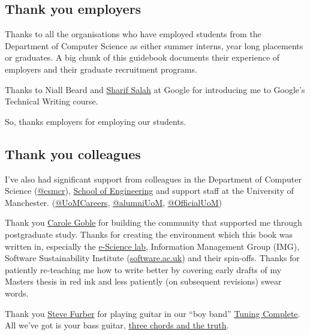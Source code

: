 \documentclass[
]{book}
\begin{document}
\hypertarget{employers}{%
\subsection{Thank you employers}\label{employers}}

Thanks to all the organisations who have employed students from the Department of Computer Science as either summer interns, year long placements or graduates. A big chunk of this guidebook documents their experience of employers and their graduate recruitment programs.

Thanks to Niall Beard and \href{https://github.com/sharifsalah}{Sharif Salah} at Google for introducing me to Google's Technical Writing course. \citep{googling}

So, thanks employers for employing our students. 🙏

\hypertarget{colleagues}{%
\subsection{Thank you colleagues}\label{colleagues}}

I've also had significant support from colleagues in the Department of Computer Science (\href{https://twitter.com/csmcr}{@csmcr}), \href{https://www.se.manchester.ac.uk/about/schools/engineering/}{School of Engineering} and support staff at the University of Manchester. (\href{https://twitter.com/UoMCareers}{@UoMCareers}, \href{https://twitter.com/alumniUoM}{@alumniUoM}, \href{https://twitter.com/OfficialUoM}{@OfficialUoM})

Thank you \href{https://en.wikipedia.org/wiki/Carole_Goble}{Carole Goble} for building the community that supported me through postgraduate study. Thanks for creating the environment which this book was written in, especially the \href{https://esciencelab.org.uk/}{e-Science lab}, Information Management Group (IMG), Software Sustainability Institute (\href{https://software.ac.uk/}{software.ac.uk}) and their spin-offs. Thanks for patiently re-teaching me how to write better by covering early drafts of my Masters thesis in red ink and less patiently (on subsequent revisions) swear words. 🤬

Thank you \href{https://en.wikipedia.org/wiki/Steve_Furber}{Steve Furber} for playing guitar in our ``boy band'' \href{https://personalpages.manchester.ac.uk/staff/duncan.hull/research.html\#tuningcomplete}{Tuning Complete}. All we've got is your bass guitar, \href{https://en.wikipedia.org/wiki/Three_Chords_and_the_Truth}{three chords and the truth}. \citep{harlan, allalongthewatchtower} 🎸
\end{document}
